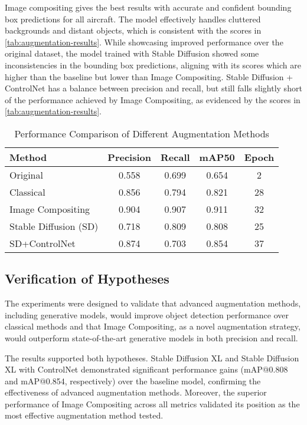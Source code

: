 Image compositing gives the best results with accurate and confident bounding box predictions for all aircraft. The model effectively handles cluttered backgrounds and distant objects, which is consistent with the scores in \autoref{tab:augmentation-results}. While showcasing improved performance over the original dataset, the model trained with Stable Diffusion showed some inconsistencies in the bounding box predictions, aligning with its scores which are higher than the baseline but lower than Image Compositing. Stable Diffusion + ControlNet has a balance between precision and recall, but still falls slightly short of the performance achieved by Image Compositing, as evidenced by the scores in \autoref{tab:augmentation-results}.

\begin{table}
\small
\centering
\caption{Performance Comparison of Different Augmentation Methods}


\setlength\tabcolsep{2pt}
\begin{tabular}{lcccc}
\toprule
Method & Precision&Recall&mAP50& Epoch\\ \midrule
Original &0.558 & 0.699 &  0.654 & 2    \\
Classical& 0.856 & 0.794 &0.821& 28 \\ 
Image Compositing &0.904 & 0.907 & 0.911 & 32 \\ 
Stable Diffusion (SD) &0.718 & 0.809 &0.808& 25   \\ 
SD+ControlNet  & 0.874 & 0.703 &0.854 & 37  \\ 

\bottomrule
\end{tabular}
\vspace{0pt}

\label{tab:augmentation-results}
\end{table}



\subsection{Verification of Hypotheses}
The experiments were designed to validate that advanced augmentation methods, including generative models, would improve object detection performance over classical methods and that Image Compositing, as a novel augmentation strategy, would outperform state-of-the-art generative models in both precision and recall.

The results supported both hypotheses. Stable Diffusion XL and Stable Diffusion XL with ControlNet demonstrated significant performance gains (mAP@0.808 and mAP@0.854, respectively) over the baseline model, confirming the effectiveness of advanced augmentation methods. 
Moreover, the superior performance of Image Compositing across all metrics validated its position as the most effective augmentation method tested.


